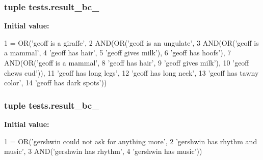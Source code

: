 \subsubsection[{result\+\_\+bc\+\_\+3}]{\setlength{\rightskip}{0pt plus 5cm}tuple tests.\+result\+\_\+bc\+\_}\label{namespacetests_ad1264ea8fc62114c2cce09081940562d}
{\bfseries Initial value\+:}
\begin{DoxyCode}
1 = OR(\textcolor{stringliteral}{'geoff is a giraffe'},
2                  AND(OR(\textcolor{stringliteral}{'geoff is an ungulate'},
3                         AND(OR(\textcolor{stringliteral}{'geoff is a mammal'},
4                                \textcolor{stringliteral}{'geoff has hair'},
5                                \textcolor{stringliteral}{'geoff gives milk'}),
6                             \textcolor{stringliteral}{'geoff has hoofs'}),
7                         AND(OR(\textcolor{stringliteral}{'geoff is a mammal'},
8                                \textcolor{stringliteral}{'geoff has hair'},
9                                \textcolor{stringliteral}{'geoff gives milk'}),
10                             \textcolor{stringliteral}{'geoff chews cud'})),
11                      \textcolor{stringliteral}{'geoff has long legs'},
12                      \textcolor{stringliteral}{'geoff has long neck'},
13                      \textcolor{stringliteral}{'geoff has tawny color'},
14                      \textcolor{stringliteral}{'geoff has dark spots'}))
\end{DoxyCode}
\hypertarget{namespacetests_a4b7edf1f7e8c1edcf3a812b38c637223}{}
\subsubsection[{result\+\_\+bc\+\_\+4}]{\setlength{\rightskip}{0pt plus 5cm}tuple tests.\+result\+\_\+bc\+\_}\label{namespacetests_a4b7edf1f7e8c1edcf3a812b38c637223}
{\bfseries Initial value\+:}
\begin{DoxyCode}
1 = OR(\textcolor{stringliteral}{'gershwin could not ask for anything more'},
2                  \textcolor{stringliteral}{'gershwin has rhythm and music'}, 
3                  AND(\textcolor{stringliteral}{'gershwin has rhythm'},
4                      \textcolor{stringliteral}{'gershwin has music'}))
\end{DoxyCode}
\hypertarget{namespacetests_a3c4894e10dff7d903a438b725ab36dc5}{}
